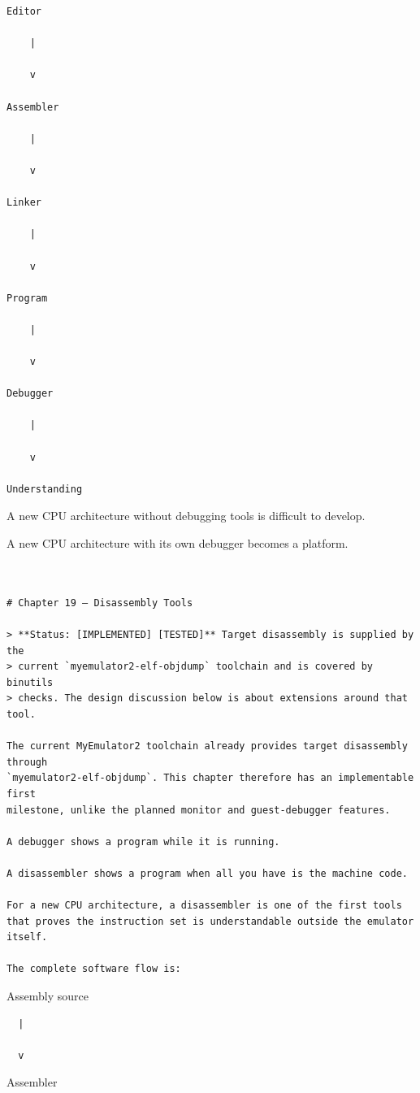 \documentclass[
  oneside,
  openany]{book}
\begin{document}
\begin{verbatim}
Editor

    |

    v

Assembler

    |

    v

Linker

    |

    v

Program

    |

    v

Debugger

    |

    v

Understanding
\end{verbatim}

A new CPU architecture without debugging tools is difficult to develop.

A new CPU architecture with its own debugger becomes a platform.

\begin{verbatim}


# Chapter 19 — Disassembly Tools

> **Status: [IMPLEMENTED] [TESTED]** Target disassembly is supplied by the
> current `myemulator2-elf-objdump` toolchain and is covered by binutils
> checks. The design discussion below is about extensions around that tool.

The current MyEmulator2 toolchain already provides target disassembly through
`myemulator2-elf-objdump`. This chapter therefore has an implementable first
milestone, unlike the planned monitor and guest-debugger features.

A debugger shows a program while it is running.

A disassembler shows a program when all you have is the machine code.

For a new CPU architecture, a disassembler is one of the first tools that proves the instruction set is understandable outside the emulator itself.

The complete software flow is:
\end{verbatim}

Assembly source

\begin{verbatim}
  |

  v
\end{verbatim}

Assembler
\end{document}

